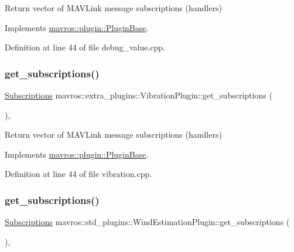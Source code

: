 Return vector of M\+A\+V\+Link message subscriptions (handlers) 



Implements \mbox{\hyperlink{group__plugin_gaf4e23fec6d7436a62cbf0942a2e5791c}{mavros\+::plugin\+::\+Plugin\+Base}}.



Definition at line 44 of file debug\+\_\+value.\+cpp.

\mbox{\label{group__plugin_gaf1faf27433bea5d716042d52aeaee805}} 
\subsubsection{\texorpdfstring{get\_subscriptions()}{get\_subscriptions()}\hspace{0.1cm}{\footnotesize\ttfamily [9/41]}}
{\footnotesize\ttfamily \mbox{\hyperlink{group__plugin_ga8967d61fc77040e0c3ea5a4585d62a09}{Subscriptions}} mavros\+::extra\+\_\+plugins\+::\+Vibration\+Plugin\+::get\+\_\+subscriptions (\begin{DoxyParamCaption}{ }\end{DoxyParamCaption})\hspace{0.3cm}{\ttfamily [inline]}, {\ttfamily [virtual]}}



Return vector of M\+A\+V\+Link message subscriptions (handlers) 



Implements \mbox{\hyperlink{group__plugin_gaf4e23fec6d7436a62cbf0942a2e5791c}{mavros\+::plugin\+::\+Plugin\+Base}}.



Definition at line 44 of file vibration.\+cpp.

\mbox{\label{group__plugin_ga7db9ebfdb92e2537b3b3b844a2483617}} 
\subsubsection{\texorpdfstring{get\_subscriptions()}{get\_subscriptions()}\hspace{0.1cm}{\footnotesize\ttfamily [10/41]}}
{\footnotesize\ttfamily \mbox{\hyperlink{group__plugin_ga8967d61fc77040e0c3ea5a4585d62a09}{Subscriptions}} mavros\+::std\+\_\+plugins\+::\+Wind\+Estimation\+Plugin\+::get\+\_\+subscriptions (\begin{DoxyParamCaption}{ }\end{DoxyParamCaption})\hspace{0.3cm}{\ttfamily [inline]}, {\ttfamily [virtual]}}



